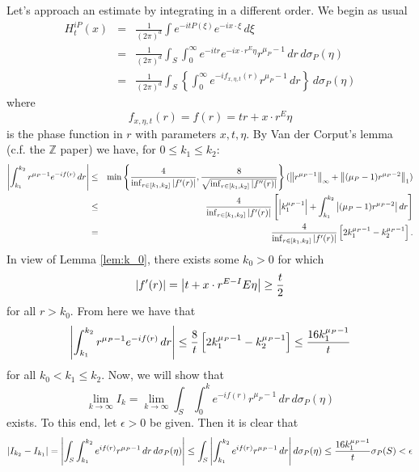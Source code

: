 \documentclass[11pt]{article}
\newcommand{\lb}{\left[}
\newcommand{\rb}{\right]}
\newcommand{\lc}{\left\{}
\newcommand{\rc}{\right\}}
\newcommand{\f}[2]{\frac{#1}{#2}}
\begin{document}
Let's approach an estimate by integrating in a different order. We begin as usual
\begin{eqnarray*}
    H^{iP}_{t}(x) &=& \f{1}{(2\pi)^{d}}\int e^{-it P(\xi)} e^{-i x\cdot \xi}\,d\xi \\
    &=& \f{1}{(2\pi)^{d}}\int_S \int_0^\infty e^{-itr} e^{-ix \cdot r^E \eta} r^{\mu_P - 1}\,dr\,d\sigma_P(\eta)\\
    &=& \f{1}{(2\pi)^{d}}\int_S \lc \int_0^\infty e^{-if_{x,\eta,t}(r)} r^{\mu_P - 1}\,dr\rc\,d\sigma_P(\eta)
\end{eqnarray*}
where
\begin{equation*}
    f_{x,\eta,t}(r) = f(r) = tr + x\cdot r^E \eta
\end{equation*}
is the phase function in $r$ with parameters $x,t,\eta$. By Van der Corput's lemma (c.f. the $\mathbb{Z}$ paper) we have, for $0 \leq k_1\leq k_2$:
\begin{eqnarray*}
    \abs{\int_{k_1}^{k_2} r^{\mu_P-1} e^{-i f(r)}\,dr} &\leq&  \min\lc \f{4}{\inf_{r\in [k_1,k_2]} \abs{f'(r)}}, \f{8}{\sqrt{\inf_{r\in [k_1,k_2]} \abs{f''(r)}}}  \rc ( \norm{r^{\mu_P - 1}}_\infty + \norm{(\mu_P - 1)r^{\mu_P - 2}}_1)\\
    &\leq&  \f{4}{\inf_{r\in [k_1,k_2]} \abs{f'(r)}}\lb \abs{k_1^{\mu_P-1}} + \int_{k_1}^{k_2} \abs{ (\mu_P - 1)r^{\mu_P - 2}}\,dr \rb\\
    &=& \f{4}{\inf_{r\in [k_1,k_2]} \abs{f'(r)}}\lb 2k_1^{\mu_P-1} - k_2^{\mu_P - 1} \rb.
\end{eqnarray*}
In view of Lemma \ref{lem:k_0}, there exists some $k_0 > 0$ for which
\begin{equation*}
    \abs{f'(r)} = \abs{t + x\cdot r^{E-I}E\eta}   \geq \f{t}{2}
\end{equation*}
for all $r> k_0$. From here we have that
\begin{equation*}
    \abs{\int_{k_1}^{k_2} r^{\mu_P-1} e^{-i f(r)}\,dr} \leq \f{8}{t}\lb 2k_1^{\mu_P-1} - k_2^{\mu_P - 1} \rb \leq \f{16 k_1^{\mu_P - 1}}{t}
\end{equation*}
for all $k_0 < k_1 \leq k_2$. Now, we will show that
\begin{equation*}
    \lim_{k\to \infty} I_k = \lim_{k\to \infty}\int_S \int_0^k e^{-if(r)}r^{\mu_P - 1}\,dr\,d\sigma_P(\eta)
\end{equation*}
exists. To this end, let $\epsilon > 0$ be given. Then it is clear that
\begin{equation*}
    \abs{I_{k_2} - I_{k_1}} = \abs{\int_S \int_{k_1}^{k_2} e^{if(r)}r^{\mu_P - 1} \,dr\,d\sigma_P(\eta) } \leq \int_S \abs{\int_{k_1}^{k_2} e^{if(r)}r^{\mu_P - 1} \,dr }\,d\sigma_P(\eta) \leq \f{16k_1^{\mu_P - 1}}{t}\sigma_P(S) < \epsilon
\end{equation*}
\end{document}
